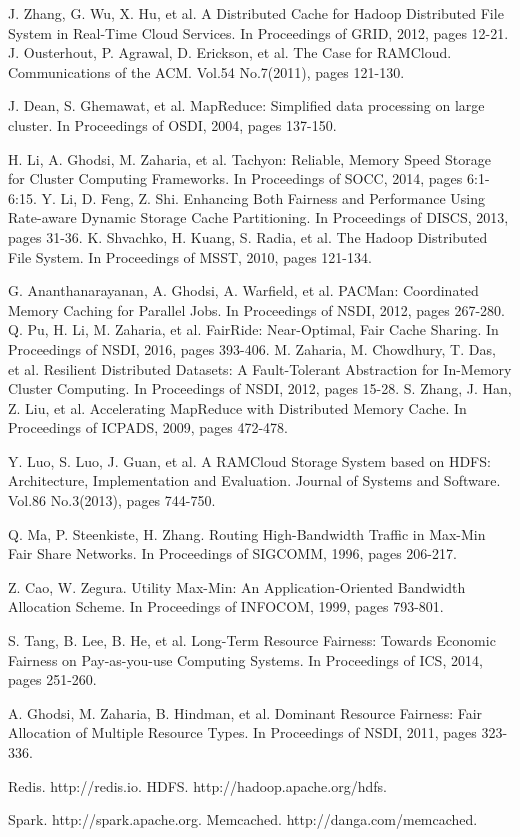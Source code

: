 \documentclass[letterpaper,twocolumn,10pt]{article}
\begin{document}
\begin{thebibliography}{99}%
%
J. Zhang, G. Wu, X. Hu, et al. A Distributed Cache for Hadoop Distributed File System in Real-Time Cloud Services. In Proceedings of GRID, 2012, pages 12-21.
%
J. Ousterhout, P. Agrawal, D. Erickson, et al. The Case for RAMCloud. Communications of the ACM. Vol.54 No.7(2011), pages 121-130.

J. Dean, S. Ghemawat, et al. MapReduce: Simplified data processing on large cluster. In Proceedings of OSDI, 2004, pages 137-150.%

H. Li, A. Ghodsi, M. Zaharia, et al. Tachyon: Reliable, Memory Speed Storage for Cluster Computing Frameworks. In Proceedings of SOCC, 2014, pages 6:1-6:15.
%
Y. Li, D. Feng, Z. Shi. Enhancing Both Fairness and Performance Using Rate-aware Dynamic Storage Cache Partitioning. In Proceedings of DISCS, 2013, pages 31-36.
%
K. Shvachko, H. Kuang, S. Radia, et al. The Hadoop Distributed File System. In Proceedings of MSST, 2010, pages 121-134.
%

G. Ananthanarayanan, A. Ghodsi, A. Warfield, et al. PACMan: Coordinated Memory Caching for Parallel Jobs. In Proceedings of NSDI, 2012, pages 267-280.
%
Q. Pu, H. Li, M. Zaharia, et al. FairRide: Near-Optimal, Fair Cache Sharing. In Proceedings of NSDI, 2016, pages 393-406.
%
M. Zaharia, M. Chowdhury, T. Das, et al. Resilient Distributed Datasets: {A} Fault-Tolerant Abstraction for In-Memory Cluster Computing. In Proceedings of NSDI, 2012, pages 15-28.
%
S. Zhang, J. Han, Z. Liu, et al. Accelerating MapReduce with Distributed Memory Cache. In Proceedings of ICPADS, 2009, pages 472-478.
%

Y. Luo, S. Luo, J. Guan, et al. A RAMCloud Storage System based on HDFS: Architecture, Implementation and Evaluation. Journal of Systems and Software. Vol.86 No.3(2013), pages 744-750.

Q. Ma, P. Steenkiste, H. Zhang. Routing High-Bandwidth Traffic in Max-Min Fair Share Networks. In Proceedings of SIGCOMM, 1996, pages 206-217.

Z. Cao, W. Zegura. Utility Max-Min: An Application-Oriented Bandwidth Allocation Scheme. In Proceedings of INFOCOM, 1999, pages 793-801.

S. Tang, B. Lee, B. He, et al. Long-Term Resource Fairness: Towards Economic Fairness on Pay-as-you-use Computing Systems. In Proceedings of ICS, 2014, pages 251-260.

A. Ghodsi, M. Zaharia, B. Hindman, et al. Dominant Resource Fairness: Fair Allocation of Multiple Resource Types. In Proceedings of NSDI, 2011, pages 323-336.

%
Redis. http://redis.io.
%
HDFS. http://hadoop.apache.org/hdfs.
%

Spark. http://spark.apache.org.
%
Memcached. http://danga.com/memcached.
\end{thebibliography}
\end{document}
